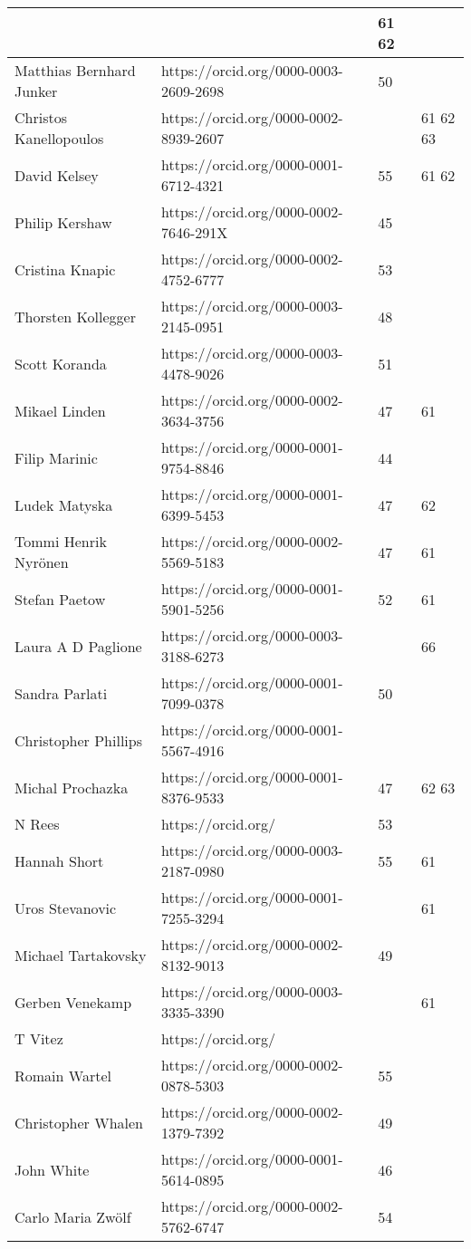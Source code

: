 \begin{center}
\begin{longtable}{|p{5cm}|C{6cm}|C{2cm}|C{2.5cm}|}
&
&61 62\\
\hline
Matthias Bernhard Junker
&https://orcid.org/0000-0003-2609-2698
&50
&\\
\hline
Christos Kanellopoulos
&https://orcid.org/0000-0002-8939-2607
&
&61 62 63\\
\hline
David Kelsey
&https://orcid.org/0000-0001-6712-4321
&55
&61 62\\
\hline
Philip Kershaw
&https://orcid.org/0000-0002-7646-291X
&45
&\\
\hline
Cristina Knapic
&https://orcid.org/0000-0002-4752-6777
&53
&\\
\hline
Thorsten Kollegger
&https://orcid.org/0000-0003-2145-0951
&48
&\\
\hline
Scott Koranda
&https://orcid.org/0000-0003-4478-9026
&51
&\\
\hline
Mikael Linden
&https://orcid.org/0000-0002-3634-3756
&47
&61\\
\hline
Filip Marinic
&https://orcid.org/0000-0001-9754-8846
&44
&\\
\hline
Ludek Matyska
&https://orcid.org/0000-0001-6399-5453
&47
&62\\
\hline
Tommi Henrik Nyr\"{o}nen
&https://orcid.org/0000-0002-5569-5183
&47
&61\\
\hline
Stefan Paetow
&https://orcid.org/0000-0001-5901-5256
&52
&61\\
\hline
Laura A D Paglione
&https://orcid.org/0000-0003-3188-6273
&
&66\\
\hline
Sandra Parlati
&https://orcid.org/0000-0001-7099-0378
&50
&\\
\hline
Christopher Phillips
&https://orcid.org/0000-0001-5567-4916
&
&\\
\hline
Michal Prochazka
&https://orcid.org/0000-0001-8376-9533
&47
&62 63\\
\hline
N Rees
&https://orcid.org/
&53
&\\
\hline
Hannah Short
&https://orcid.org/0000-0003-2187-0980
&55
&61\\
\hline
Uros Stevanovic
&https://orcid.org/0000-0001-7255-3294
&
&61\\
\hline
Michael Tartakovsky
&https://orcid.org/0000-0002-8132-9013
&49
&\\
\hline
Gerben Venekamp
&https://orcid.org/0000-0003-3335-3390
&
&61\\
\hline
T Vitez
&https://orcid.org/
&
&\\
\hline
Romain Wartel
&https://orcid.org/0000-0002-0878-5303
&55
&\\
\hline
Christopher Whalen
&https://orcid.org/0000-0002-1379-7392
&49
&\\
\hline
John White
&https://orcid.org/0000-0001-5614-0895
&46
&\\
\hline
Carlo Maria Zw\"{o}lf
&https://orcid.org/0000-0002-5762-6747
&54
&\\
\hline
                                       

\end{longtable}
\end{center}
